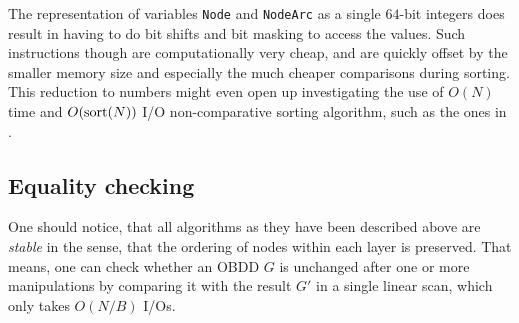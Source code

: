 The representation of variables \lstinline{Node} and \lstinline{NodeArc} as a
single $64$-bit integers does result in having to do bit shifts and bit masking
to access the values. Such instructions though are computationally very cheap,
and are quickly offset by the smaller memory size and especially the much
cheaper comparisons during sorting. This reduction to numbers might even open up
investigating the use of $O(N)$ time and $O(\text{sort}(N))$ I/O non-comparative sorting
algorithm, such as the ones in \todocite.

\subsection{Equality checking}
One should notice, that all algorithms as they have been described above are
\emph{stable} in the sense, that the ordering of nodes within each layer is
preserved. That means, one can check whether an OBDD $G$ is unchanged after one
or more manipulations by comparing it with the result $G'$ in a single linear
scan, which only takes $O(N/B)$ I/Os.


